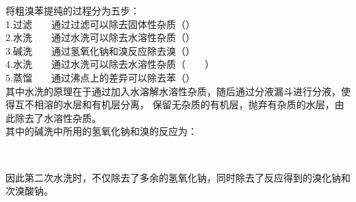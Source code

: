 \documentclass[UTF8]{ctexart}
\begin{document}
    将粗溴苯提纯的过程分为五步：\\[3mm]
    1.过滤~~~~通过过滤可以除去固体性杂质（）\\[3mm]
    2.水洗~~~~通过水洗可以除去水溶性杂质（）\\[3mm]
    3.碱洗~~~~通过氢氧化钠和溴反应除去溴（）\\[3mm]
    4.水洗~~~~通过水洗可以除去水溶性杂质（~~~~）\\[3mm]
    5.蒸馏~~~~通过沸点上的差异可以除去苯（）\\[6mm]
    其中水洗的原理在于通过加入水溶解水溶性杂质，随后通过分液漏斗进行分液，使得互不相溶的水层和有机层分离，
    保留无杂质的有机层，抛弃有杂质的水层，由此除去了水溶性杂质。\\[3mm]
    其中的碱洗中所用的氢氧化钠和溴的反应为：
    \begin{center}
        \\[3mm]
    \end{center}
    因此第二次水洗时，不仅除去了多余的氢氧化钠，同时除去了反应得到的溴化钠和次溴酸钠。


\newpage
\end{document}
